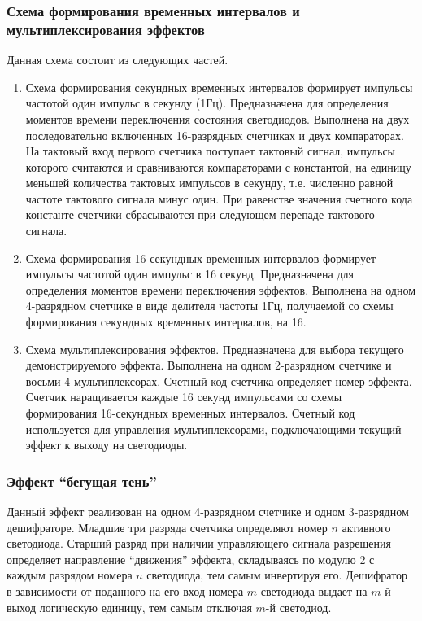 \subsubsection{Схема формирования временных интервалов и мультиплексирования эффектов\label{sec:time-interval-generator}}

Данная схема состоит из следующих частей.

\begin{enumerate}[label=\asbuk*)]

\item Схема формирования секундных временных интервалов формирует импульсы частотой один импульс в секунду (1Гц). Предназначена для определения моментов времени переключения состояния светодиодов. Выполнена на двух последовательно включенных 16-разрядных счетчиках и двух компараторах. На тактовый вход первого счетчика поступает тактовый сигнал, импульсы которого считаются и сравниваются компараторами с константой, на единицу меньшей количества тактовых импульсов в секунду, т.е. численно равной частоте тактового сигнала минус один. При равенстве значения счетного кода константе счетчики сбрасываются при следующем перепаде тактового сигнала.

\item Схема формирования 16-секундных временных интервалов формирует импульсы частотой один импульс в 16 секунд. Предназначена для определения моментов времени переключения эффектов. Выполнена на одном 4-разрядном счетчике в виде делителя частоты 1Гц, получаемой со схемы формирования секундных временных интервалов, на 16.

\item Схема мультиплексирования эффектов. Предназначена для выбора текущего демонстрируемого эффекта. Выполнена на одном 2-разрядном счетчике и восьми 4-мультиплексорах. Счетный код счетчика определяет номер эффекта. Счетчик наращивается каждые 16 секунд импульсами со схемы формирования 16-секундных временных интервалов. Счетный код используется для управления мультиплексорами, подключающими текущий эффект к выходу на светодиоды.

\end{enumerate}

\subsubsection{Эффект \enquote{бегущая тень}}

Данный эффект реализован на одном 4-разрядном счетчике и одном 3-разрядном дешифраторе. Младшие три разряда счетчика определяют номер $n$ активного светодиода. Старший разряд при наличии управляющего сигнала разрешения определяет направление \enquote{движения} эффекта, складываясь по модулю 2 с каждым разрядом номера $n$ светодиода, тем самым инвертируя его. Дешифратор в зависимости от поданного на его вход номера $m$ светодиода выдает на $m$-й выход логическую единицу, тем самым отключая $m$-й светодиод.

